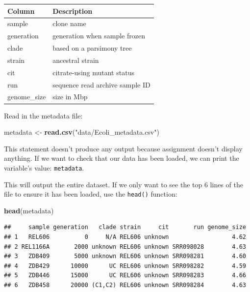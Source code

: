 \documentclass[
]{book}
\newenvironment{Shaded}{\begin{snugshade}}{\end{snugshade}}
\newcommand{\FunctionTok}[1]{\textcolor[rgb]{0.13,0.29,0.53}{\textbf{#1}}}
\newcommand{\NormalTok}[1]{#1}
\newcommand{\OtherTok}[1]{\textcolor[rgb]{0.56,0.35,0.01}{#1}}
\newcommand{\StringTok}[1]{\textcolor[rgb]{0.31,0.60,0.02}{#1}}
\begin{document}
\begin{longtable}[]{@{}ll@{}}
\toprule\noalign{}
Column & Description \\
\midrule\noalign{}
\endhead
\bottomrule\noalign{}
\endlastfoot
sample & clone name \\
generation & generation when sample frozen \\
clade & based on a parsimony tree \\
strain & ancestral strain \\
cit & citrate-using mutant status \\
run & sequence read archive sample ID \\
genome\_size & size in Mbp \\
\end{longtable}

Read in the metadata file:

\begin{Shaded}
\begin{Highlighting}[]
\NormalTok{metadata }\OtherTok{\textless{}{-}} \FunctionTok{read.csv}\NormalTok{(}\StringTok{"data/Ecoli\_metadata.csv"}\NormalTok{)}
\end{Highlighting}
\end{Shaded}

This statement doesn't produce any output because assignment doesn't display anything. If we want to check that our data has been loaded, we can print the variable's value: \texttt{metadata}.

This will output the entire dataset. If we only want to see the top 6 lines of the file to ensure it has been loaded, use the \texttt{head()} function:

\begin{Shaded}
\begin{Highlighting}[]
\FunctionTok{head}\NormalTok{(metadata)}
\end{Highlighting}
\end{Shaded}

\begin{verbatim}
##     sample generation   clade strain     cit       run genome_size
## 1   REL606          0     N/A REL606 unknown                  4.62
## 2 REL1166A       2000 unknown REL606 unknown SRR098028        4.63
## 3   ZDB409       5000 unknown REL606 unknown SRR098281        4.60
## 4   ZDB429      10000      UC REL606 unknown SRR098282        4.59
## 5   ZDB446      15000      UC REL606 unknown SRR098283        4.66
## 6   ZDB458      20000 (C1,C2) REL606 unknown SRR098284        4.63
\end{verbatim}
\end{document}
